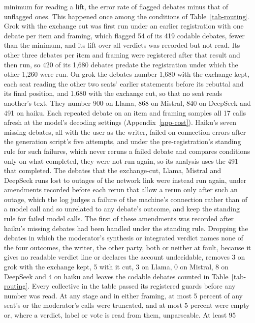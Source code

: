 minimum for reading a lift, the error rate of flagged debates minus that of
unflagged ones.
This happened once among the conditions of Table~\ref{tab-routing}. Grok
with the exchange cut was first run under an earlier registration with one
debate per item and framing, which flagged 54 of its 419 codable debates,
fewer than the minimum, and its lift over all verdicts was recorded but not
read. Its other three debates per item and framing were registered after
that result and then run, so 420 of its 1,680 debates predate the
registration under which the other 1,260 were run.
On grok
the debates number 1,680 with the exchange kept, each seat reading the other
two seats' earlier statements before its rebuttal and its final position,
and 1,680 with the exchange cut, so that no seat reads another's text. They
number 900 on Llama, 868 on Mistral, 840 on DeepSeek and 491 on haiku.
Each repeated debate on an item and framing samples all 17 calls afresh at
the model's decoding settings (Appendix~\ref{app-cost}).
Haiku's seven missing debates, all with the user as the writer, failed on
connection errors after the generation script's five attempts, and under the
pre-registration's standing rule for such failures, which never reruns a
failed debate and compares conditions only on what completed, they were not
run again, so its analysis uses the 491 that completed. The debates that the
exchange-cut, Llama, Mistral and DeepSeek runs lost to outages of the network
link were instead run again, under amendments recorded before each rerun
that allow a rerun only after such an outage, which the log judges a failure
of the machine's connection rather than of a model call and so unrelated to
any debate's outcome, and keep the standing rule for failed model calls. The
first of these amendments was recorded after haiku's missing debates had
been handled under the standing rule.
Dropping the debates in which the moderator's
synthesis or integrated verdict names none of the four outcomes, the writer,
the other party, both or neither at fault, because it gives no readable
verdict line or declares the account undecidable, removes 3 on grok with the
exchange kept, 5 with it cut, 3 on Llama, 0 on Mistral, 8 on DeepSeek and 4
on haiku and leaves the codable debates counted in Table~\ref{tab-routing}.
Every collective in the table passed its registered guards before any number
was read. At any stage and in either framing, at most 5 percent of any seat's
or the moderator's calls were truncated, and at most 5 percent were empty or,
where a verdict, label or vote is read from them, unparseable. At least 95
